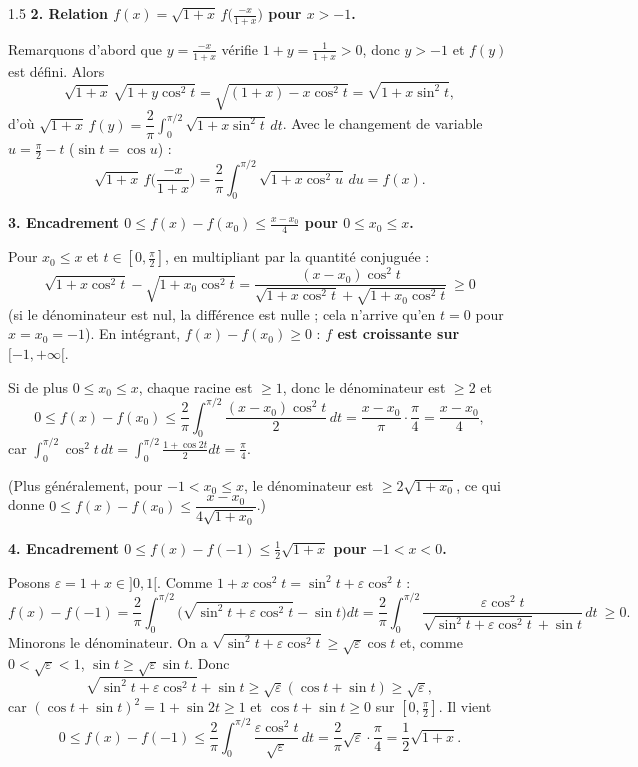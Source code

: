 \documentclass[12pt]{article}
\begin{document}
\begin{spacing}{1.5}
\textbf{2. Relation $f(x)=\sqrt{1+x}\,f\big(\frac{-x}{1+x}\big)$ pour $x>-1$.}

Remarquons d'abord que $y=\frac{-x}{1+x}$ vérifie $1+y=\frac1{1+x}>0$, donc $y>-1$ et $f(y)$ est défini. Alors
\[
\sqrt{1+x}\,\sqrt{1+y\cos^2t}=\sqrt{(1+x)-x\cos^2t}=\sqrt{1+x\sin^2t},
\]
d'où $\sqrt{1+x}\,f(y)=\dfrac2\pi\displaystyle\int_0^{\pi/2}\sqrt{1+x\sin^2t}\,dt$. Avec le changement de variable $u=\frac\pi2-t$ ($\sin t=\cos u$) :
\[
\sqrt{1+x}\,f\Big(\frac{-x}{1+x}\Big)=\frac2\pi\int_0^{\pi/2}\sqrt{1+x\cos^2u}\,du=f(x).
\]

\textbf{3. Encadrement $0\le f(x)-f(x_0)\le\frac{x-x_0}{4}$ pour $0\le x_0\le x$.}


Pour $x_0\le x$ et $t\in[0,\frac\pi2]$, en multipliant par la quantité conjuguée :
\[
\sqrt{1+x\cos^2t}-\sqrt{1+x_0\cos^2t}=\frac{(x-x_0)\cos^2t}{\sqrt{1+x\cos^2t}+\sqrt{1+x_0\cos^2t}}\ \ge0
\]
(si le dénominateur est nul, la différence est nulle ; cela n'arrive qu'en $t=0$ pour $x=x_0=-1$). En intégrant, $f(x)-f(x_0)\ge0$ : \textbf{$f$ est croissante sur $[-1,+\infty[$}.

Si de plus $0\le x_0\le x$, chaque racine est $\ge1$, donc le dénominateur est $\ge2$ et
\[
0\le f(x)-f(x_0)\le\frac2\pi\int_0^{\pi/2}\frac{(x-x_0)\cos^2t}{2}\,dt=\frac{x-x_0}{\pi}\cdot\frac\pi4=\frac{x-x_0}{4},
\]
car $\displaystyle\int_0^{\pi/2}\cos^2t\,dt=\int_0^{\pi/2}\frac{1+\cos2t}{2}dt=\frac\pi4$.

(Plus généralement, pour $-1<x_0\le x$, le dénominateur est $\ge2\sqrt{1+x_0}$, ce qui donne $0\le f(x)-f(x_0)\le\dfrac{x-x_0}{4\sqrt{1+x_0}}$.)

\textbf{4. Encadrement $0\le f(x)-f(-1)\le\frac12\sqrt{1+x}$ pour $-1<x<0$.}

Posons $\varepsilon=1+x\in]0,1[$. Comme $1+x\cos^2t=\sin^2t+\varepsilon\cos^2t$ :
\[
f(x)-f(-1)=\frac2\pi\int_0^{\pi/2}\Big(\sqrt{\sin^2t+\varepsilon\cos^2t}-\sin t\Big)dt=\frac2\pi\int_0^{\pi/2}\frac{\varepsilon\cos^2t}{\sqrt{\sin^2t+\varepsilon\cos^2t}+\sin t}\,dt\ \ge0 .
\]
Minorons le dénominateur. On a $\sqrt{\sin^2t+\varepsilon\cos^2t}\ge\sqrt\varepsilon\cos t$ et, comme $0<\sqrt\varepsilon<1$, $\sin t\ge\sqrt\varepsilon\sin t$. Donc
\[
\sqrt{\sin^2t+\varepsilon\cos^2t}+\sin t\ge\sqrt\varepsilon(\cos t+\sin t)\ge\sqrt\varepsilon,
\]
car $(\cos t+\sin t)^2=1+\sin2t\ge1$ et $\cos t+\sin t\ge0$ sur $[0,\frac\pi2]$. Il vient
\[
0\le f(x)-f(-1)\le\frac2\pi\int_0^{\pi/2}\frac{\varepsilon\cos^2t}{\sqrt\varepsilon}\,dt=\frac2\pi\sqrt\varepsilon\cdot\frac\pi4=\boxed{\frac12\sqrt{1+x}}.
\]


\end{spacing}
\end{document}
